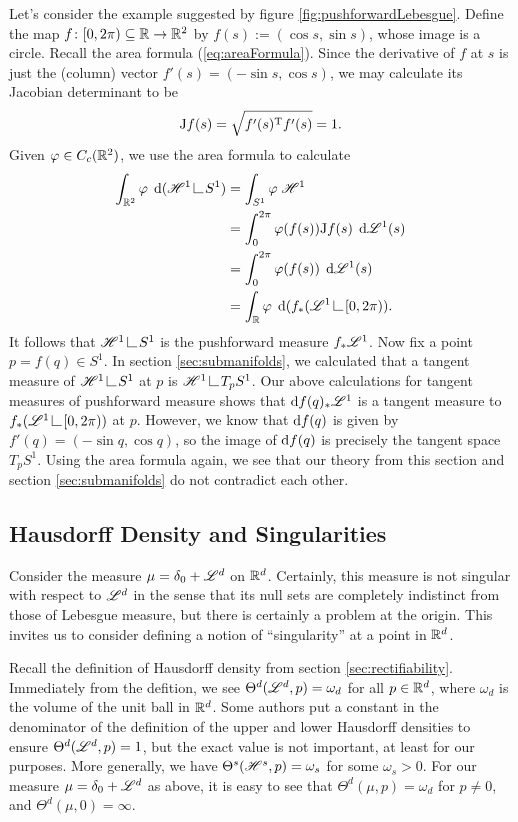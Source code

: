 Let's consider the example suggested by figure \ref{fig:pushforwardLebesgue}. Define the map $f \colon [0,2\pi) \subseteq \mathbb{R} \to \mathbb{R}^2$ by $f(s) := (\cos{s},\sin{s})$, whose image is a circle. Recall the area formula (\ref{eq:areaFormula}). Since the derivative of $f$ at $s$ is just the (column) vector $f'(s) = (-\sin{s},\cos{s})$, we may calculate its Jacobian determinant to be
\begin{equation}
    \mathrm{J}f(s) = \sqrt{f'(s)^{\mathrm{T}} f'(s)} = 1.
\end{equation}
Given $\varphi \in C_c(\mathbb{R}^2)$, we use the area formula to calculate 
\begin{equation} \begin{aligned}
    \int_{\bbR^2} \phi \; \d(\scrH^1 \restrict S^1) &= \int_{S^1} \phi \; \scrH^1 \\
    &= \int_0^{2\pi} \phi(f(s)) \J f(s) \; \d\scrL^1(s) \\
    &= \int_0^{2\pi} \phi(f(s)) \; \d\scrL^1(s) \\
    &= \int_\bbR \phi \; \d(f_*(\scrL^1 \restrict [0,2\pi)).
\end{aligned} \end{equation}
It follows that $\scrH^1 \restrict S^1$ is the pushforward measure $f_*\mathscr{L}^1$. Now fix a point $p = f(q) \in S^1$. In section \ref{sec:submanifolds}, we calculated that a tangent measure of $\scrH^1 \restrict S^1$ at $p$ is $\scrH^1 \restrict T_p S^1$. Our above calculations for tangent measures of pushforward measure shows that $\operatorname{d}\!{f}(q)_* \mathscr{L}^1$ is a tangent measure to $f_* (\scrL^1 \restrict [0,2\pi))$ at $p$. However, we know that $\operatorname{d}\!{f}(q)$ is given by $f'(q) = (-\sin{q},\cos{q})$, so the image of $\operatorname{d}\!{f}(q)$ is precisely the tangent space $T_p S^1$. Using the area formula again, we see that our theory from this section and section \ref{sec:submanifolds} do not contradict each other.


\subsection{Hausdorff Density and Singularities}
Consider the measure $\mu = \delta_0 + \mathscr{L}^d$ on $\mathbb{R}^d$. Certainly, this measure is not singular with respect to $\mathscr{L}^d$ in the sense that its null sets are completely indistinct from those of Lebesgue measure, but there is certainly a problem at the origin. This invites us to consider defining a notion of ``singularity'' at a point in $\mathbb{R}^d$.

Recall the definition of Hausdorff density from section \ref{sec:rectifiability}. Immediately from the defition, we see $\Theta^d(\mathscr{L}^d,p) = \omega_d$ for all $p \in \mathbb{R}^d$, where $\omega_d$ is the volume of the unit ball in $\mathbb{R}^d$. Some authors put a constant in the denominator of the definition of the upper and lower Hausdorff densities to ensure $\Theta^d(\mathscr{L}^d,p) = 1$, but the exact value is not important, at least for our purposes. More generally, we have $\Theta^s(\mathscr{H}^s,p) = \omega_s$ for some $\omega_s > 0$. For our measure $\mu = \delta_0 + \mathscr{L}^d$ as above, it is easy to see that $\Theta^d(\mu,p) = \omega_d$ for $p \neq 0$, and $\Theta^d(\mu,0) = \infty$. 

